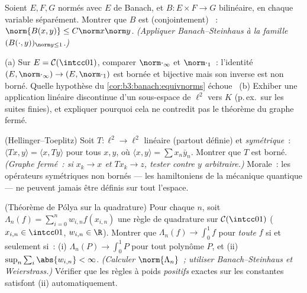 \begin{exercise}[$\star\star$]\label{exo:b3:banach:6}
Soient $E, F, G$ normés avec $E$ de Banach, et $B \colon E
\times F \to G$ bilinéaire,  en chaque variable
séparément. Montrer que $B$ est (conjointement) ~:
$\norm{B(x,y)} \leq C\norm x\norm y$. \emph{(Appliquer
Banach--Steinhaus à la famille $(B(\cdot, y))_{\norm y \leq
1}$.)}
\end{exercise}

\begin{exercise}[$\star\star$]\label{exo:b3:banach:7}
(a) Sur $E = \mathcal C(\intcc01)$, comparer
$\norm\cdot_\infty$ et $\norm\cdot_1$~: l'identité $(E,
\norm\cdot_\infty) \to (E, \norm\cdot_1)$ est bornée et
bijective mais son inverse est non borné. Quelle hypothèse du
\cref{cor:b3:banach:equivnorms} échoue~
(b) Exhiber une application linéaire discontinue d'un
sous-espace  de $\ell^2$ vers $K$ (p.\,ex.\ sur les
suites finies), et expliquer pourquoi cela ne contredit pas le
théorème du graphe fermé.
\end{exercise}

\begin{exercise}[$\star\star\star$]\label{exo:b3:banach:8}
(Hellinger--Toeplitz) Soit $T \colon \ell^2 \to \ell^2$
linéaire (partout définie) et \emph{symétrique}~: $\langle
Tx, y\rangle = \langle x, Ty\rangle$ pour tous $x, y$, où
$\langle x, y \rangle = \sum x_n\bar y_n$. Montrer que $T$
est borné. \emph{(Graphe fermé~: si $x_k \to x$ et $Tx_k \to
z$, tester contre $y$ arbitraire.)} Morale~: les opérateurs
symétriques non bornés --- les hamiltoniens de la mécanique
quantique --- ne peuvent jamais être définis sur tout
l'espace.
\end{exercise}

\begin{exercise}[$\star\star\star$]\label{exo:b3:banach:9}
(Théorème de Pólya sur la quadrature) Pour chaque $n$, soit
$\Lambda_n(f) = \sum_{i=0}^{n} w_{i,n}f(x_{i,n})$ une règle de
quadrature sur $\mathcal C(\intcc01)$ ($x_{i,n} \in
\intcc01$, $w_{i,n} \in \R$). Montrer que $\Lambda_n(f) \to
\int_0^1f$ pour \emph{toute} $f$  si et seulement
si~: (i) $\Lambda_n(P) \to \int_0^1P$ pour tout polynôme $P$,
et (ii) $\sup_n\sum_i\abs{w_{i,n}} < \infty$.
\emph{(Calculer $\norm{\Lambda_n}$~; utiliser
Banach--Steinhaus et Weierstrass.)} Vérifier que les règles à
poids \emph{positifs} exactes sur les constantes satisfont
(ii) automatiquement.
\end{exercise}


